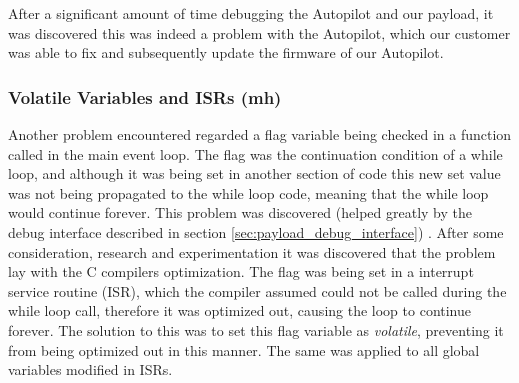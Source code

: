 After a significant amount of time debugging the Autopilot and our 
payload, it was discovered this was indeed a problem with the Autopilot, 
which our customer was able to fix and subsequently update the firmware 
of our Autopilot.

\subsubsection*{Volatile Variables and ISRs (mh)}

Another problem encountered regarded a flag variable being checked in a function called in the main event loop. The flag
was the continuation condition of a while loop, and although it was being set in another section of code this new set 
value was not being propagated to the while loop code, meaning that the while loop would continue forever. This problem
was discovered (helped greatly by the debug interface described in section \ref{sec:payload_debug_interface}) . After some
consideration, research and experimentation it was discovered that the problem lay with the C compilers optimization. The 
flag was being set in a interrupt service routine (ISR), which the compiler assumed could not be called during the while loop
call, therefore it was optimized out, causing the loop to continue forever. The solution to this was to set this flag variable 
as \emph{volatile}, preventing it from being optimized out in this manner. The same was applied to all global variables modified in ISRs.




